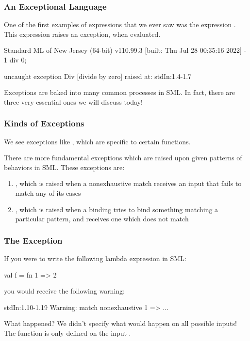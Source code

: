 \documentclass[aspectratio=169]{beamer}
\begin{document}
\begin{frame}[fragile]
  \frametitle{An Exceptional Language}

  One of the first examples of expressions that we ever saw was the 
  expression . This expression raises an exception, 
  when evaluated.

  \pause
  \vspace{\fill}

  \begin{codeblock}
    Standard ML of New Jersey (64-bit) v110.99.3 [built: Thu Jul 28 00:35:16 2022]
    - 1 div 0;

    uncaught exception Div [divide by zero]
      raised at: stdIn:1.4-1.7
  \end{codeblock}

  \pause
  \vspace{\fill}

  Exceptions are baked into many common processes in SML. In fact, there are
  three very essential ones we will discuss today!
\end{frame}

\begin{frame}[fragile]
  \frametitle{Kinds of Exceptions}

  We see exceptions like , which are specific to certain functions.

  \pause
  \vspace{\fill}

  There are more fundamental exceptions which are raised upon given patterns
  of behaviors in SML. These exceptions are:
  \pause
  \begin{enumerate}
    \item {}, which is raised when a nonexhaustive match receives
    an input that fails to match any of its cases \pause
    \item {}, which is raised when a  binding tries to
    bind something matching a particular pattern, and receives one which
    does not match
  \end{enumerate}
\end{frame}

\begin{frame}[fragile]
  \frametitle{The  Exception}

  If you were to write the following lambda expression in SML:
  \begin{codeblock}
    val f = fn 1 => 2
  \end{codeblock}

  you would receive the following warning:
  \pause
  \begin{codeblock}
    stdIn:1.10-1.19 Warning: match nonexhaustive
              1 => ...
  \end{codeblock}

  \pause
  \vspace{\fill}

  What happened? We didn't specify what would happen on all possible inputs!
  The function is only defined on the input .
\end{frame}
\end{document}
